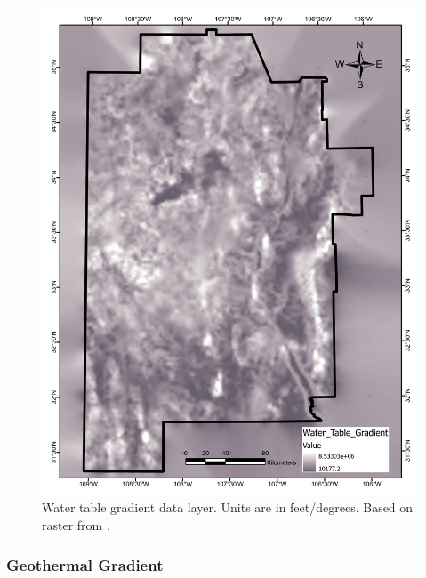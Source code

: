 \begin{figure}[!htp]
\centering
\includegraphics[scale=.50]{templates/images/Figure-WTGradient.pdf}
\caption[Water table gradient data layer]{Water table gradient data layer. Units are in feet/degrees. Based on raster from \protect\citep{bielicki_hydrogeolgic_2015}.}
\label{fig:feat_wt_gradient}
\end{figure}

\subsubsection{Geothermal Gradient}


